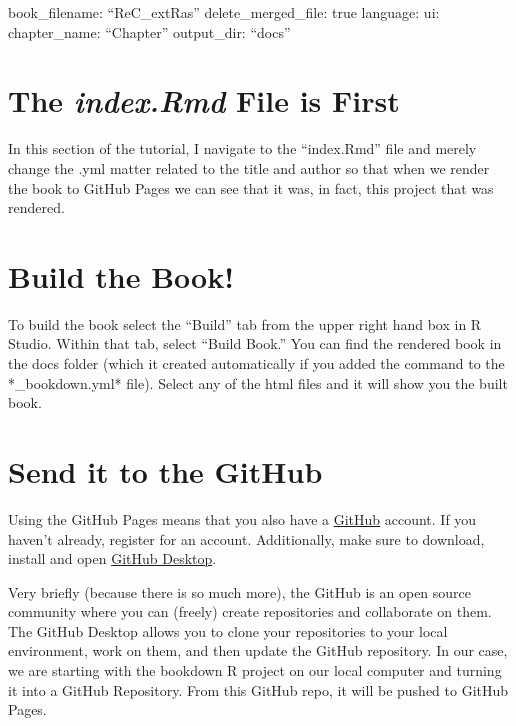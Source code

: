 \documentclass[
]{book}
\begin{document}
book\_filename: ``ReC\_extRas''
delete\_merged\_file: true
language:
ui:
chapter\_name: ``Chapter''
output\_dir: ``docs''

\hypertarget{the-index.rmd-file-is-first}{%
\section{\texorpdfstring{The \emph{index.Rmd} File is First}{The index.Rmd File is First}}\label{the-index.rmd-file-is-first}}

In this section of the tutorial, I navigate to the ``index.Rmd'' file and merely change the .yml matter related to the title and author so that when we render the book to GitHub Pages we can see that it was, in fact, this project that was rendered.

\hypertarget{build-the-book}{%
\section{Build the Book!}\label{build-the-book}}

To build the book select the ``Build'' tab from the upper right hand box in R Studio. Within that tab, select ``Build Book.'' You can find the rendered book in the docs folder (which it created automatically if you added the command to the *\_bookdown.yml* file). Select any of the html files and it will show you the built book.

\hypertarget{send-it-to-the-github}{%
\section{Send it to the GitHub}\label{send-it-to-the-github}}

Using the GitHub Pages means that you also have a \href{https://github.com}{GitHub} account. If you haven't already, register for an account. Additionally, make sure to download, install and open \href{https://desktop.github.com/}{GitHub Desktop}.

Very briefly (because there is so much more), the GitHub is an open source community where you can (freely) create repositories and collaborate on them. The GitHub Desktop allows you to clone your repositories to your local environment, work on them, and then update the GitHub repository. In our case, we are starting with the bookdown R project on our local computer and turning it into a GitHub Repository. From this GitHub repo, it will be pushed to GitHub Pages.
\end{document}
